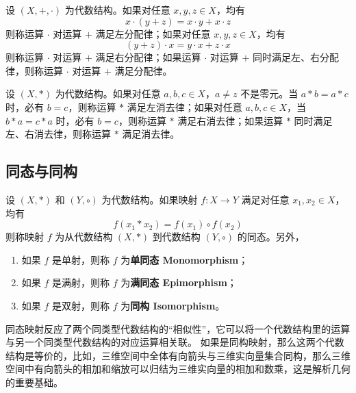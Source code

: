 \begin{definition} 
    设 $ (X,+,\cdot) $ 为代数结构。如果对任意 $ x,y,z\in X $，均有
    \[
        x \cdot (y + z) = x \cdot y + x \cdot z
    \]
    则称运算 $ \cdot $ 对运算 $ + $ 满足左分配律；如果对任意 $ x,y,z\in X $，均有
    \[
        (y + z) \cdot x = y \cdot x + z \cdot x
    \]
    则称运算 $ \cdot $ 对运算 $ + $ 满足右分配律；如果运算 $ \cdot $ 对运算 $ + $ 同时满足左、右分配律，则称运算 $ \cdot $ 对运算 $ + $ 满足分配律。
\end{definition}
\vspace{1em}

\begin{definition}
    设 $ (X,\ast) $ 为代数结构。如果对任意 $ a,b,c\in X $，$a\neq z$ 不是零元。当 $ a\ast b = a\ast c $ 时，必有 $ b=c $，则称运算 $ \ast $ 满足左消去律；如果对任意 $ a,b,c\in X $，当 $ b\ast a = c\ast a $ 时，必有 $ b=c $，则称运算 $ \ast $ 满足右消去律；如果运算 $ \ast $ 同时满足左、右消去律，则称运算 $ \ast $ 满足消去律。
\end{definition}
\vspace{1em}

\subsection{同态与同构}
\begin{definition}[同态 Homomorphism]
    设 $ (X,\ast) $ 和 $ (Y,\circ) $ 为代数结构。如果映射 $ f:X\to Y $ 满足对任意 $ x_1,x_2\in X $，均有
    \[
        f(x_1 \ast x_2) = f(x_1) \circ f(x_2)
    \]
    则称映射 $ f $ 为从代数结构 $ (X,\ast) $ 到代数结构 $ (Y,\circ) $ 的同态。另外，
    \begin{enumerate}
        \item 如果 $ f $ 是单射，则称 $ f $ 为\textbf{单同态 Monomorphism}；
        \item 如果 $ f $ 是满射，则称 $ f $ 为\textbf{满同态 Epimorphism}；
        \item 如果 $ f $ 是双射，则称 $ f $ 为\textbf{同构 Isomorphism}。
    \end{enumerate}
\end{definition}

\begin{note}
    同态映射反应了两个同类型代数结构的“相似性”，它可以将一个代数结构里的运算与另一个同类型代数结构的对应运算相关联。
    如果是同构映射，那么这两个代数结构是等价的，比如，三维空间中全体有向箭头与三维实向量集合同构，那么三维空间中有向箭头的相加和缩放可以归结为三维实向量的相加和数乘，这是解析几何的重要基础。
\end{note}
\vspace{1em}

